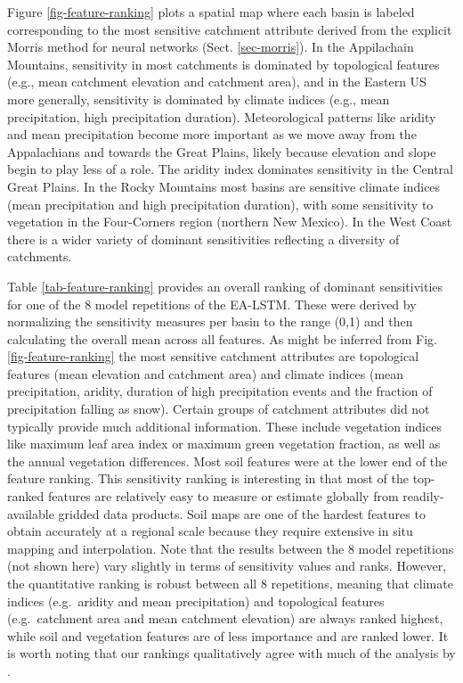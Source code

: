 Figure \ref{fig-feature-ranking} plots a spatial map where each basin is labeled corresponding to the most sensitive catchment attribute derived from the explicit Morris method for neural networks (Sect. \ref{sec-morris}). 
In the Appilachain Mountains, sensitivity in most catchments is dominated by topological features (e.g., mean catchment elevation and catchment area), and in the Eastern US more generally, sensitivity is dominated by climate indices (e.g., mean precipitation, high precipitation duration). Meteorological patterns like aridity and mean precipitation become more important as we move away from the Appalachians and towards the Great Plains, likely because elevation and slope begin to play less of a role. The aridity index dominates sensitivity in the Central Great Plains. In the Rocky Mountains most basins are sensitive climate indices (mean precipitation and high precipitation duration), with some sensitivity to vegetation in the Four-Corners region (northern New Mexico). In the  West Coast there is a wider variety of dominant sensitivities reflecting a diversity of catchments. 

Table \ref{tab-feature-ranking} provides an overall ranking of dominant sensitivities for one of the 8 model repetitions of the \gls{EA-LSTM}.
These were derived by normalizing the sensitivity measures per basin to the range (0,1) and then calculating the overall mean across all features. As might be inferred from Fig. \ref{fig-feature-ranking} the most sensitive catchment attributes are topological features (mean elevation and catchment area) and climate indices (mean precipitation, aridity, duration of high precipitation events and the fraction of precipitation falling as snow). Certain groups of catchment attributes did not typically provide much additional information. These include vegetation indices like maximum leaf area index or maximum green vegetation fraction, as well as the annual vegetation differences. Most soil features were at the lower end of the feature ranking. This sensitivity ranking is interesting in that most of the top-ranked features are relatively easy to measure or estimate globally from readily-available gridded data products. Soil maps are one of the hardest features to obtain accurately at a regional scale because they require extensive in situ mapping and interpolation. Note that the results between the 8 model repetitions (not shown here) vary slightly in terms of sensitivity values and ranks. However, the quantitative ranking is robust between all 8 repetitions, meaning that climate indices (e.g.\ aridity and mean precipitation) and topological features (e.g.\ catchment area and mean catchment elevation) are always ranked highest, while soil and vegetation features are of less importance and are ranked lower. It is worth noting that our rankings qualitatively agree with much of the analysis by \citet{addor2018selection}.

